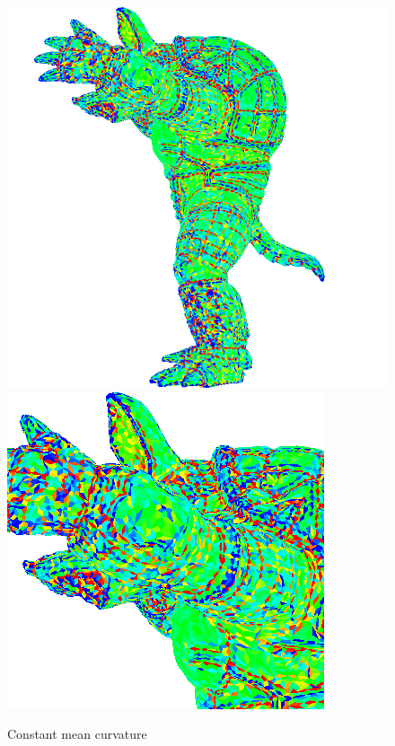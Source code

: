 \begin{figure}[!h]
    \centering
    \centering
    \includegraphics[scale=0.48]{images/mean-curvature-edge.png}
    \endminipage\hfill
    \centering
    \includegraphics[scale=1.0]{images/mean-curvature-edge-detail.png}
    \endminipage
    \caption{Constant mean curvature} \label{fig:armadillo-mean-edge}
\end{figure}

